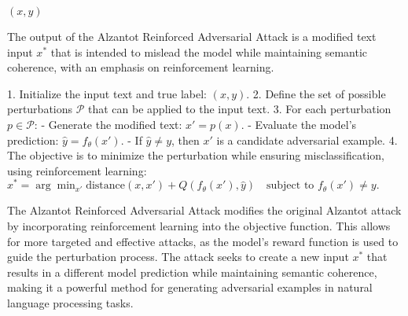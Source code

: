 $(x, y)$

The output of the Alzantot Reinforced Adversarial Attack is a modified text input $x^*$ that is intended to mislead the model while maintaining semantic coherence, with an emphasis on reinforcement learning.

1. Initialize the input text and true label:
   $
   (x, y).
   $
2. Define the set of possible perturbations $\mathcal{P}$ that can be applied to the input text.
3. For each perturbation $p \in \mathcal{P}$:
   - Generate the modified text:
   $
   x' = p(x).
   $
   - Evaluate the model's prediction:
   $
   \hat{y} = f_{\theta}(x').
   $
   - If $\hat{y} \neq y$, then $x'$ is a candidate adversarial example.
4. The objective is to minimize the perturbation while ensuring misclassification, using reinforcement learning:
   $
   x^* = \arg\min_{x'} \text{distance}(x, x') + Q(f_{\theta}(x'), \hat{y}) \quad \text{subject to } f_{\theta}(x') \neq y.
   $

The Alzantot Reinforced Adversarial Attack modifies the original Alzantot attack by incorporating reinforcement learning into the objective function. This allows for more targeted and effective attacks, as the model's reward function is used to guide the perturbation process. The attack seeks to create a new input $x^*$ that results in a different model prediction while maintaining semantic coherence, making it a powerful method for generating adversarial examples in natural language processing tasks.